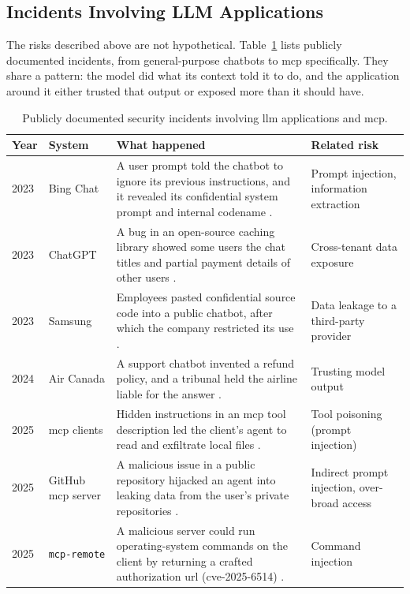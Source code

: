 \subsection{Incidents Involving LLM Applications}
\label{sec:llm-incidents}

The risks described above are not hypothetical. Table~\ref{tab:incidents} lists publicly documented incidents, from general-purpose chatbots to \gls{mcp} specifically. They share a pattern: the model did what its context told it to do, and the application around it either trusted that output or exposed more than it should have.

\begin{table}[htbp]
\centering
\small
\begin{tabular}{p{0.9cm} >{\raggedright\arraybackslash}p{2.5cm} p{7.4cm} >{\raggedright\arraybackslash}p{3.0cm}}
\hline
\textbf{Year} & \textbf{System} & \textbf{What happened} & \textbf{Related risk} \\
\hline
2023 & Bing Chat & A user prompt told the chatbot to ignore its previous instructions, and it revealed its confidential system prompt and internal codename \citep{edwards2023bing}. & Prompt injection, information extraction \\
2023 & ChatGPT & A bug in an open-source caching library showed some users the chat titles and partial payment details of other users \citep{openai2023outage}. & Cross-tenant data exposure \\
2023 & Samsung & Employees pasted confidential source code into a public chatbot, after which the company restricted its use \citep{gurman2023samsung}. & Data leakage to a third-party provider \\
2024 & Air Canada & A support chatbot invented a refund policy, and a tribunal held the airline liable for the answer \citep{moffatt2024aircanada}. & Trusting model output \\
2025 & \acrshort{mcp} clients & Hidden instructions in an \gls{mcp} tool description led the client's agent to read and exfiltrate local files \citep{invariant2025toolpoisoning}. & Tool poisoning (prompt injection) \\
2025 & GitHub \acrshort{mcp} server & A malicious issue in a public repository hijacked an agent into leaking data from the user's private repositories \citep{invariant2025github}. & Indirect prompt injection, over-broad access \\
2025 & \texttt{mcp-remote} & A malicious server could run operating-system commands on the client by returning a crafted authorization \acrshort{url} (\acrshort{cve}-2025-6514) \citep{jfrog2025mcpremote}. & Command injection \\
\hline
\end{tabular}
\caption{Publicly documented security incidents involving \gls{llm} applications and \gls{mcp}.}
\label{tab:incidents}
\end{table}

